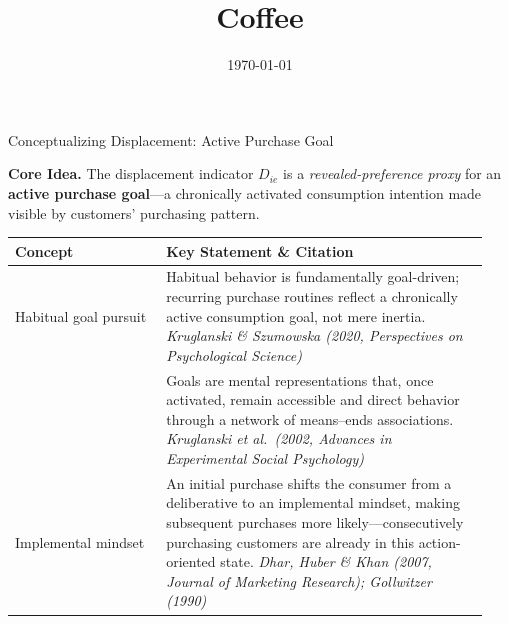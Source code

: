 \documentclass[aspectratio=169]{beamer}  %
\title{Coffee}
\date{\today}
\begin{document}
\begin{frame}
    \titlepage
\end{frame}

\begin{frame}{Conceptualizing Displacement: Active Purchase Goal}
\footnotesize

\textbf{Core Idea.}
The displacement indicator $D_{ie}$ is a \emph{revealed-preference proxy} for an
\textbf{active purchase goal}---a chronically activated consumption intention
made visible by customers' purchasing pattern.

\vspace{0.5cm}

\medskip
\tiny
\begin{tabular}{@{} p{0.30\linewidth} p{0.64\linewidth} @{}}
\toprule
\textbf{Concept} & \textbf{Key Statement \& Citation} \\
\midrule
Habitual goal pursuit &
Habitual behavior is fundamentally goal-driven; recurring
purchase routines reflect a chronically active consumption goal,
not mere inertia.
\newline
\textit{Kruglanski \& Szumowska (2020, Perspectives on Psychological Science)} \\
\addlinespace[4pt]
 &
Goals are mental representations that, once activated,
remain accessible and direct behavior through a network
of means--ends associations.
\newline
\textit{Kruglanski et al.\ (2002, Advances in Experimental Social Psychology)} \\
\addlinespace[4pt]
Implemental mindset &
An initial purchase shifts the consumer from a deliberative
to an implemental mindset, making subsequent purchases more
likely---consecutively purchasing customers are already in
this action-oriented state.
\newline
\textit{Dhar, Huber \& Khan (2007, Journal of Marketing Research);
Gollwitzer (1990)} \\
\bottomrule
\end{tabular}
\end{frame}
\end{document}
